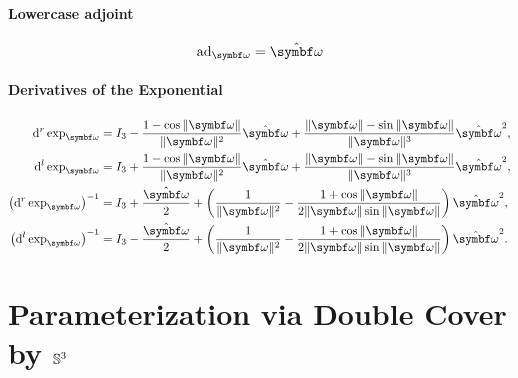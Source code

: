 \begin{properties}[breakable, title={$\SOthree$}]
  \paragraph{Lowercase adjoint}
  \begin{equation}
    \ad_\bomega = \hat \bomega
  \end{equation}

  \paragraph{Derivatives of the Exponential}
  \begin{subequations}
    \begin{align}
      \mathrm{d}^r \exp_{\bomega}                     & =        I_3 - \frac{1 - \cos \| \bomega \|}{\| \bomega \|^2} \hat {\bomega} + \frac{ \| \bomega \| - \sin \| \bomega \| }{\| \bomega\|^3} \hat {\bomega}^2, \\
      \mathrm{d}^l \exp_{\bomega}                     & = I_3 + \frac{1 - \cos \| \bomega \|}{\| \bomega \|^2} \hat {\bomega} + \frac{ \| \bomega \| - \sin \| \bomega \| }{\| \bomega\|^3} \hat {\bomega}^2,        \\
      \left( \mathrm{d}^r \exp_{\bomega} \right)^{-1} & = I_3 + \frac{\hat \bomega}{2} + \left( \frac{1}{\| \bomega \|^2} - \frac{1 + \cos \| \bomega \| }{2 \|\bomega \| \sin \|\bomega \|} \right) \hat \bomega^2, \\
      \left( \mathrm{d}^l \exp_{\bomega} \right)^{-1} & = I_3 - \frac{\hat \bomega}{2} + \left( \frac{1}{\| \bomega \|^2} - \frac{1 + \cos \| \bomega \| }{2 \|\bomega \| \sin \|\bomega \|} \right) \hat \bomega^2.
    \end{align}
  \end{subequations}
\end{properties}

\section{Parameterization via Double Cover by ${\mathbb{S}^3}$}

